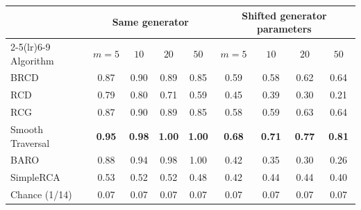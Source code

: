 \begin{tabular}{l cccc cccc}
\toprule
& \multicolumn{4}{c}{Same generator} & \multicolumn{4}{c}{Shifted generator parameters} \\
\cmidrule(lr){2-5}\cmidrule(lr){6-9}
Algorithm & $m{=}5$ & $10$ & $20$ & $50$ & $m{=}5$ & $10$ & $20$ & $50$ \\
\midrule
BRCD & 0.87 & 0.90 & 0.89 & 0.85 & 0.59 & 0.58 & 0.62 & 0.64 \\
RCD & 0.79 & 0.80 & 0.71 & 0.59 & 0.45 & 0.39 & 0.30 & 0.21 \\
RCG & 0.87 & 0.90 & 0.89 & 0.85 & 0.58 & 0.59 & 0.63 & 0.64 \\
Smooth Traversal & \cellcolor{gray!20}\textbf{0.95} & \cellcolor{gray!20}\textbf{0.98} & \cellcolor{gray!20}\textbf{1.00} & \cellcolor{gray!20}\textbf{1.00} & \cellcolor{gray!20}\textbf{0.68} & \cellcolor{gray!20}\textbf{0.71} & \cellcolor{gray!20}\textbf{0.77} & \cellcolor{gray!20}\textbf{0.81} \\
BARO & 0.88 & 0.94 & 0.98 & 1.00 & 0.42 & 0.35 & 0.30 & 0.26 \\
SimpleRCA & 0.53 & 0.52 & 0.52 & 0.48 & 0.42 & 0.44 & 0.44 & 0.40 \\
\midrule
Chance (1/14) & 0.07 & 0.07 & 0.07 & 0.07 & 0.07 & 0.07 & 0.07 & 0.07 \\
\bottomrule
\end{tabular}
